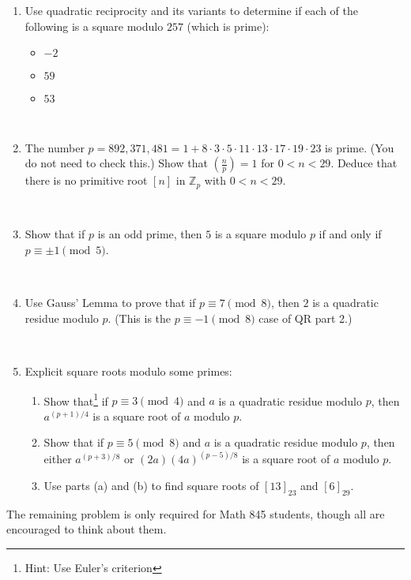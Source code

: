 \documentclass{amsart}
\def\Z{\mathbb Z}
\begin{document}
\begin{enumerate}

\item Use quadratic reciprocity and its variants to determine if each of the following is a square modulo $257$ (which is prime):
\begin{itemize}
\item $-2$
\item $59$
\item $53$
\end{itemize}


\

\item The number $p=892,371,481=1+8\cdot 3\cdot 5\cdot 11 \cdot 13 \cdot 17 \cdot 19 \cdot 23$ is prime. (You do not need to check this.) Show that $\left(\frac{n}{p}\right) = 1$ for $0< n < 29$. Deduce that there is no primitive root $[n]$ in $\Z_p$ with $0<n<29$.

\


\item Show that if $p$ is an odd prime, then $5$ is a square modulo $p$ if and only if $p\equiv \pm 1 \pmod{5}$.

\

\item Use Gauss' Lemma to prove that if $p\equiv 7 \pmod 8$, then $2$ is a quadratic residue modulo $p$. (This is the $p\equiv -1\pmod 8$ case of QR part 2.)

\

\item Explicit square roots modulo some primes:
\begin{enumerate}
\item Show that\footnote{Hint: Use Euler's criterion} if $p\equiv 3 \pmod{4}$ and $a$ is a quadratic residue modulo $p$, then $a^{(p+1)/4}$ is a square root of $a$ modulo $p$.
\item Show that if $p\equiv 5 \pmod{8}$ and $a$ is a quadratic residue modulo $p$, then either $a^{(p+3)/8}$ or $(2a) (4a)^{(p-5)/8}$ is a square root of $a$ modulo $p$.
\item Use parts (a) and (b) to find square roots of $[13]_{23}$ and $[6]_{29}$.
\end{enumerate}


\end{enumerate}

\noindent  \hrulefill

\noindent The remaining problem is only required for Math 845 students, though all are encouraged to think about them.
\end{document}
